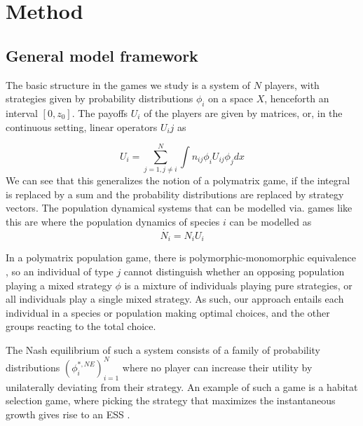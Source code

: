 \section{Method}
\subsection*{General model framework}

The basic structure in the games we study is a system of $N$ players, with strategies given by probability distributions $\phi_i$ on a space $X$, henceforth an interval $[0,z_0]$. The payoffs $U_i$ of the players are given by matrices, or, in the continuous setting, linear operators $U_ij$ as

\begin{equation}
  \label{eq:utility}
  U_i = \sum_{j=1,j\neq i}^N \int n_{ij}\phi_i U_{ij} \phi_j dx%
\end{equation}
We can see that this generalizes the notion of a polymatrix game, if the integral is replaced by a sum and the probability distributions are replaced by strategy vectors. The population dynamical systems that can be modelled via. games like this are where the population dynamics of species $i$ can be modelled as
\begin{equation}
  \dot{N_i} = N_i U_i
\end{equation}

In a polymatrix population game, there is polymorphic-monomorphic equivalence \citep{cressmannbook}, so an individual of type $j$ cannot distinguish whether an opposing population playing a mixed strategy $\phi$ is a mixture of individuals playing pure strategies, or all individuals play a single mixed strategy. As such, our approach entails each individual in a species or population making optimal choices, and the other groups reacting to the total choice.

The Nash equilibrium of such a system consists of a family of probability distributions $(\phi_i^{*,NE})_{i=1}^N$ where no player can increase their utility by unilaterally deviating from their strategy. An example of such a game is a habitat selection game, where picking the strategy that maximizes the instantaneous growth gives rise to an ESS \citep{kvrivan2009}.

